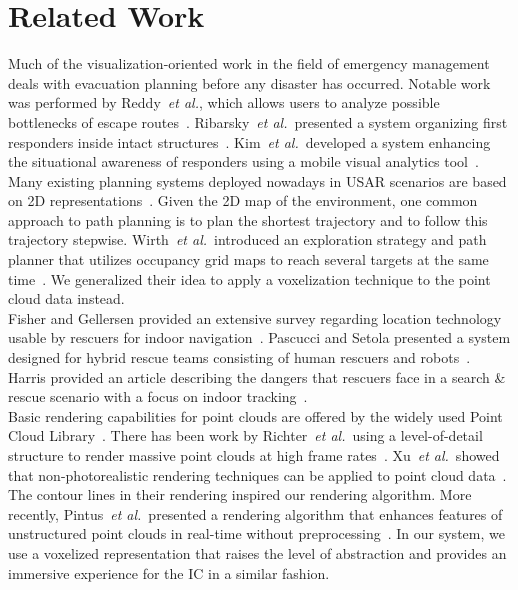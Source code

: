 \documentclass{egpubl}
\def\etal{\textit{et al.}}
\begin{document}
\section{Related Work} \label{sec:relatedwork}
 Much of the visualization-oriented work in the field of emergency management deals with evacuation planning before any disaster has occurred. Notable work was performed by Reddy~\etal, which allows users to analyze possible bottlenecks of escape routes~\cite{EuroVA12:13-17:2012}. Ribarsky~\etal\ presented a system organizing first responders inside intact structures~\cite{Ribarsky:2010}. Kim~\etal\ developed a system enhancing the situational awareness of responders using a mobile visual analytics tool~\cite{Kim:2008}. Many existing planning systems deployed nowadays in USAR scenarios are based on 2D representations~\cite{kleiner_et_al_ssrr09,KohlbrecherMeyerStrykKlingaufFlexibleSlamSystem2011}. Given the 2D map of the environment, one common approach to path planning is to plan the shortest trajectory and to follow this trajectory stepwise. Wirth~\etal\ introduced an exploration strategy and path planner that utilizes occupancy grid maps to reach several targets at the same time~\cite{Wirth2007ETA1}. We generalized their idea to apply a voxelization technique to the point cloud data instead.\\
%
 Fisher and Gellersen provided an extensive survey regarding location technology usable by rescuers for indoor navigation~\cite{fischer2010location}. Pascucci and Setola presented a system designed for hybrid rescue teams consisting of human rescuers and robots~\cite{pascucci2011indoor}. Harris provided an article describing the dangers that rescuers face in a search \& rescue scenario with a focus on indoor tracking~\cite{harris2013way}.\\
%
 Basic rendering capabilities for point clouds are offered by the widely used Point Cloud Library~\cite{Rusu11ICRA}. There has been work by Richter~\etal\ using a level-of-detail structure to render massive point clouds at high frame rates~\cite{Richter:2010:ORV:1811158.1811178}. Xu~\etal\ showed that non-photorealistic rendering techniques can be applied to point cloud data~\cite{conf/npar/XuC04}. The contour lines in their rendering inspired our rendering algorithm. More recently, Pintus~\etal\ presented a rendering algorithm that enhances features of unstructured point clouds in real-time without preprocessing~\cite{Pintus:2011:RRM:2384495.2384513}. In our system, we use a voxelized representation that raises the level of abstraction and provides an immersive experience for the IC in a similar fashion.
\end{document}
